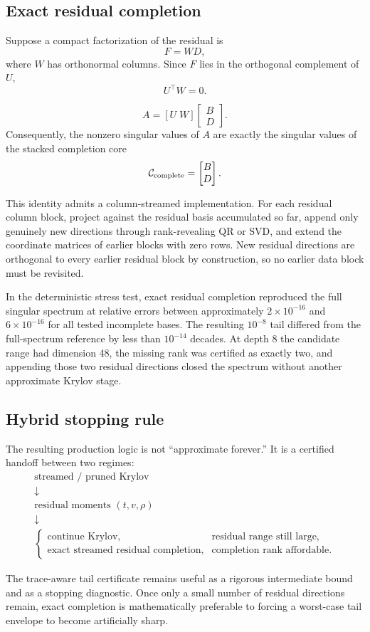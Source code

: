\subsection{Exact residual completion}

Suppose a compact factorization of the residual is
\[
F=WD,
\]
where \(W\) has orthonormal columns.  Since \(F\) lies in the orthogonal
complement of \(U\),
\[
U^\top W=0.
\]

\begin{theorem}
\[
\boxed{
A
=
[U\;W]
\begin{bmatrix}
B\\D
\end{bmatrix}.
}
\]
Consequently, the nonzero singular values of \(A\) are exactly the singular
values of the stacked completion core
\[
\mathcal C_{\rm complete}
=
\begin{bmatrix}
B\\D
\end{bmatrix}.
\]
\end{theorem}

This identity admits a column-streamed implementation.  For each residual
column block, project against the residual basis accumulated so far, append
only genuinely new directions through rank-revealing QR or SVD, and extend the
coordinate matrices of earlier blocks with zero rows.  New residual directions
are orthogonal to every earlier residual block by construction, so no earlier
data block must be revisited.

In the deterministic stress test, exact residual completion reproduced the
full singular spectrum at relative errors between approximately
\(2\times10^{-16}\) and \(6\times10^{-16}\) for all tested incomplete bases.
The resulting \(10^{-8}\) tail differed from the full-spectrum reference by
less than \(10^{-14}\) decades.  At depth 8 the candidate range had dimension
48, the missing rank was certified as exactly two, and appending those two
residual directions closed the spectrum without another approximate Krylov
stage.

\subsection{Hybrid stopping rule}

The resulting production logic is not ``approximate forever.''  It is a
certified handoff between two regimes:
\[
\boxed{
\begin{array}{c}
\text{streamed / pruned Krylov}\\[2mm]
\downarrow\\[-1mm]
\text{residual moments }(t,v,\rho)\\[2mm]
\downarrow\\[-1mm]
\begin{cases}
\text{continue Krylov}, & \text{residual range still large},\\
\text{exact streamed residual completion}, & \text{completion rank affordable}.
\end{cases}
\end{array}
}
\]

The trace-aware tail certificate remains useful as a rigorous intermediate
bound and as a stopping diagnostic.  Once only a small number of residual
directions remain, exact completion is mathematically preferable to forcing a
worst-case tail envelope to become artificially sharp.

